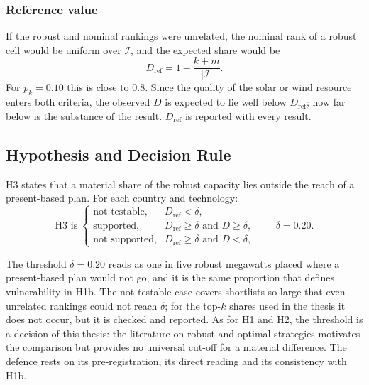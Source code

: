 \subsubsection{Reference value}

If the robust and nominal rankings were unrelated, the nominal rank of a robust
cell would be uniform over $\mathcal{I}$, and the expected share would be
\begin{equation}
    D_{\mathrm{ref}}=1-\frac{k+m}{|\mathcal{I}|}.
    \label{eq:h3_reference}
\end{equation}
For $p_k=0.10$ this is close to $0.8$. Since the quality of the solar or wind
resource enters both criteria, the observed $D$ is expected to lie well below
$D_{\mathrm{ref}}$; how far below is the substance of the result.
$D_{\mathrm{ref}}$ is reported with every result.

\subsection{Hypothesis and Decision Rule}
\label{subsec:h3_rule}

H3 states that a material share of the robust capacity lies outside the reach of
a present-based plan. For each country and technology:
\begin{equation}
    \text{H3 is}\;
    \begin{cases}
        \text{not testable}, & D_{\mathrm{ref}}<\delta,\\
        \text{supported}, & D_{\mathrm{ref}}\geq\delta \text{ and } D\geq\delta,\\
        \text{not supported}, & D_{\mathrm{ref}}\geq\delta \text{ and } D<\delta,
    \end{cases}
    \qquad \delta=0.20 .
    \label{eq:h3_rule}
\end{equation}

The threshold $\delta=0.20$ reads as one in five robust megawatts placed where a
present-based plan would not go, and it is the same proportion that defines
vulnerability in H1b. The not-testable case covers shortlists so large that even
unrelated rankings could not reach $\delta$; for the top-$k$ shares used in the
thesis it does not occur, but it is checked and reported. As for H1 and H2, the
threshold is a decision of this thesis: the literature on robust and optimal
strategies motivates the comparison but provides no universal cut-off for a
material difference. The defence rests on its pre-registration, its direct
reading and its consistency with H1b.

